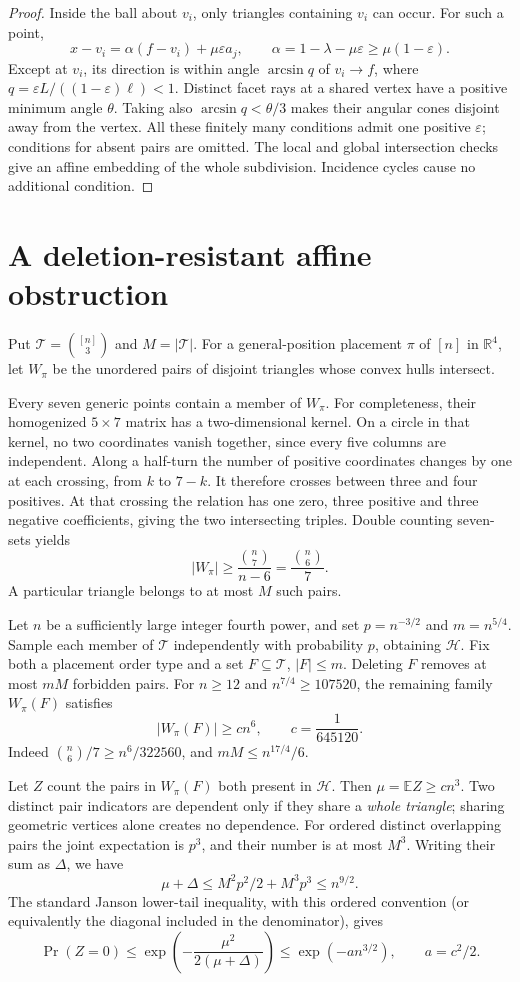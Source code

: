 \documentclass[11pt]{article}
\newcommand{\R}{\mathbb R}
\begin{document}
\begin{proof}
Inside the ball about $v_i$, only triangles containing $v_i$ can
occur. For such a point,
\[
x-v_i=\alpha(f-v_i)+\mu\varepsilon a_j,\qquad
\alpha=1-\lambda-\mu\varepsilon\ge\mu(1-\varepsilon).
\]
Except at $v_i$, its direction is within angle $\arcsin q$ of
$v_i\to f$, where
$q=\varepsilon L/((1-\varepsilon)\ell)<1$.
Distinct facet rays at a shared vertex have a positive minimum
angle $\theta$. Taking also $\arcsin q<\theta/3$ makes their
angular cones disjoint away from the vertex.
All these finitely many conditions admit one positive $\varepsilon$;
conditions for absent pairs are omitted. The local and global
intersection checks give an affine embedding of the whole
subdivision. Incidence cycles cause no additional condition.
\end{proof}

\section{A deletion-resistant affine obstruction}
Put $\mathcal T=\binom{[n]}3$ and $M=|\mathcal T|$.
For a general-position placement $\pi$ of $[n]$ in $\R^4$, let
$W_\pi$ be the unordered pairs of disjoint triangles whose convex
hulls intersect.

Every seven generic points contain a member of $W_\pi$.
For completeness, their homogenized $5\times7$ matrix has a
two-dimensional kernel. On a circle in that kernel, no two
coordinates vanish together, since every five columns are independent.
Along a half-turn the number of positive coordinates changes by one
at each crossing, from $k$ to $7-k$. It therefore crosses between
three and four positives. At that crossing the relation has one zero,
three positive and three negative coefficients, giving the two
intersecting triples. Double counting seven-sets yields
\[
|W_\pi|\ge\frac{\binom n7}{n-6}=\frac{\binom n6}{7}.
\]
A particular triangle belongs to at most $M$ such pairs.

Let $n$ be a sufficiently large integer fourth power, and set
$p=n^{-3/2}$ and $m=n^{5/4}$. Sample each member of $\mathcal T$
independently with probability $p$, obtaining $\mathcal H$.
Fix both a placement order type and a set $F\subseteq\mathcal T$,
$|F|\le m$. Deleting $F$ removes at most $mM$ forbidden pairs.
For $n\ge12$ and $n^{7/4}\ge107520$, the remaining family $W_\pi(F)$
satisfies
\[
|W_\pi(F)|\ge c n^6,\qquad c=\frac1{645120}.
\]
Indeed $\binom n6/7\ge n^6/322560$, and $mM\le n^{17/4}/6$.

Let $Z$ count the pairs in $W_\pi(F)$ both present in $\mathcal H$.
Then $\mu=\mathbb EZ\ge cn^3$.
Two distinct pair indicators are dependent only if they share a
\emph{whole triangle}; sharing geometric vertices alone creates no
dependence. For ordered distinct overlapping pairs the joint
expectation is $p^3$, and their number is at most $M^3$.
Writing their sum as $\Delta$, we have
\[
\mu+\Delta\le M^2p^2/2+M^3p^3\le n^{9/2}.
\]
The standard Janson lower-tail inequality, with this ordered
convention (or equivalently the diagonal included in the denominator),
gives \cite{Janson90,FK}
\[
\Pr(Z=0)\le
\exp\!\left(-\frac{\mu^2}{2(\mu+\Delta)}\right)
\le\exp(-a n^{3/2}),\qquad a=c^2/2.
\]
\end{document}
